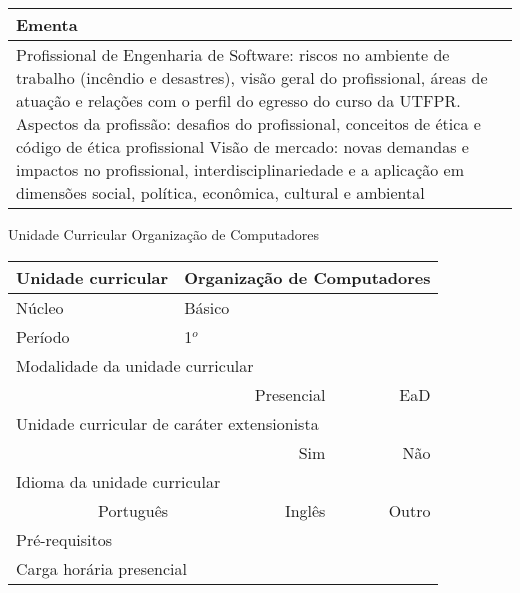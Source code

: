 \begin{quadro}[ht!]
\begin{tabular}{|p{3cm} p{2cm} p{3cm} p{2cm} p{3cm} p{2cm}|}
\multicolumn{6}{|p{15cm}|}{\cellcolor{blue1} Ementa} \\\hline
\hline\multicolumn{6}{|p{15cm}|}{\scriptsize Profissional de Engenharia de Software: riscos no ambiente de trabalho (incêndio e desastres), visão geral do profissional, áreas de atuação e relações com o perfil do egresso do curso da UTFPR. Aspectos da profissão: desafios do profissional, conceitos de ética e código de ética profissional Visão de mercado: novas demandas e impactos no profissional, interdisciplinariedade e a aplicação em dimensões social, política, econômica, cultural e ambiental}\\\hline 
\hline
	\end{tabular}
\end{quadro}


\begin{quadro}[ht!]
  \centering\scriptsize
\caption{Unidade Curricular Organização de Computadores}
\label{unit_2}
\begin{tabular}{|p{3cm} p{2cm} p{3cm} p{2cm} p{3cm} p{2cm}|}\hline
\multicolumn{1}{|p{3cm}|}{\cellcolor{blue1} Unidade curricular} & \multicolumn{5}{p{9cm}|}{Organização de Computadores}\\\hline
\multicolumn{1}{|p{3cm}|}{\cellcolor{blue1} Núcleo} & \multicolumn{5}{p{11.5cm}|}{Básico}\\\hline
\multicolumn{1}{|p{3cm}|}{\cellcolor{blue1} Período} & \multicolumn{5}{p{9cm}|}{1$^o$}\\\hline
\multicolumn{6}{|p{15cm}|}{\cellcolor{blue1} Modalidade da unidade curricular} \\\hline
\multicolumn{2}{|r}{		} &  \multicolumn{2}{r}{Presencial \XBox} & \multicolumn{2}{r|}{EaD \Square	} \\\hline
\multicolumn{6}{|p{15cm}|}{\cellcolor{blue1} Unidade curricular de caráter extensionista} \\\hline
\multicolumn{4}{|r}{			Sim \Square	} & \multicolumn{2}{r|}{	Não \XBox	}\\\hline
\multicolumn{6}{|p{15cm}|}{\cellcolor{blue1} Idioma da unidade curricular} \\ \hline
\multicolumn{2}{|r}{	Português \XBox	} &  \multicolumn{2}{r}{	Inglês \Square	} & \multicolumn{2}{r|}{	Outro \Square	} \\ \hline
\multicolumn{1}{|p{3cm}|}{\cellcolor{blue1} Pré-requisitos} & \multicolumn{5}{p{9cm}|}{}\\ \hline
\multicolumn{6}{|p{15cm}|}{\cellcolor{blue1} Carga horária presencial} \\ \hline

\end{tabular}
\end{quadro}
